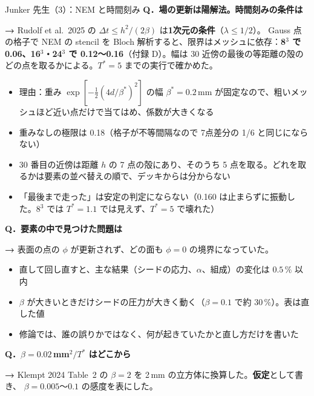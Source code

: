 \documentclass[aspectratio=169,11pt]{beamer}
\newcommand{\Q}[1]{\textbf{Q．#1}}
\newcommand{\A}[1]{\vspace{2pt}\colorbox{c3!10}{\parbox{0.95\linewidth}{%
  \small\textbf{→ }#1}}\vspace{3pt}}
\begin{document}
\begin{frame}[shrink=3]{Junker 先生（3）：NEM と時間刻み}
\small\Q{場の更新は陽解法。時間刻みの条件は}
\A{Rudolf et al.\ 2025 の $\Delta t\le h^2/(2\beta)$ は\textbf{1次元の条件}（$\lambda\le1/2$）。
Gauss 点の格子で NEM の stencil を Bloch 解析すると、限界はメッシュに依存：\textbf{8$^3$ で 0.06、16$^3$・24$^3$ で 0.12〜0.16}（付録 D）。幅は 30 近傍の最後の等距離の殻のどの点を取るかによる。$T^*=5$ までの実行で確かめた。}
\begin{itemize}\footnotesize
  \item 理由：重み $\exp[-\frac12(4d/\beta^*)^2]$ の幅 $\beta^*=0.2$\,mm が固定なので、粗いメッシュほど近い点だけで当てはめ、係数が大きくなる
  \item 重みなしの極限は 0.18（格子が不等間隔なので 7点差分の 1/6 と同じにならない）
  \item 30 番目の近傍は距離 $h$ の 7 点の殻にあり、そのうち 5 点を取る。どれを取るかは要素の並べ替えの順で、デッキからは分からない
  \item 「最後まで走った」は安定の判定にならない（0.160 は止まらずに振動した。8$^3$ では $T^*=1.1$ では見えず、$T^*=5$ で壊れた）
\end{itemize}
\vspace{3pt}
\small\Q{要素の中で見つけた問題は}
\A{表面の点の $\phi$ が更新されず、どの面も $\phi=0$ の境界になっていた。}
\begin{itemize}\footnotesize
  \item 直して回し直すと、主な結果（シードの応力、$\alpha$、組成）の変化は $0.5\,\%$ 以内
  \item $\beta$ が大きいときだけシードの圧力が大きく動く（$\beta=0.1$ で約 $30\,\%$）。表は直した値
  \item 修論では、誰の誤りかではなく、何が起きていたかと直し方だけを書いた
\end{itemize}
\vspace{3pt}
\small\Q{$\beta=0.02$\,mm$^2/T^*$ はどこから}
\A{Klempt 2024 Table~2 の $\beta=2$ を 2\,mm の立方体に換算した。\textbf{仮定}として書き、
$\beta=0.005$〜$0.1$ の感度を表にした。}
\end{frame}
\end{document}
